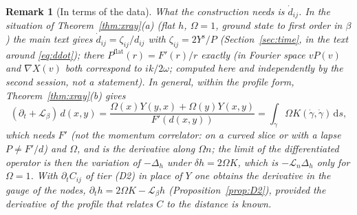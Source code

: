 \documentclass[11pt,a4paper]{article}
\theoremstyle{stmt}
\theoremstyle{defn}
\theoremstyle{rmk}
\newtheorem{remark}[theorem]{Remark}
\numberwithin{equation}{section}
\newcommand{\Lie}{\mathcal{L}}
\newcommand{\dd}{\mathrm{d}}
\begin{document}
{\begin{remark}[In terms of the data]
What the construction needs is $\dot d_{ij}$. In the situation of Theorem~\ref{thm:xray}(a) (flat $h$, $\Omega=1$, ground state to first order in $\beta$) the main text gives $\dot d_{ij}=\zeta_{ij}/d_{ij}$ with $\zeta_{ij}=2Y^{\mathrm s}/P$ (Section~\ref{sec:time}, in the text around \eqref{eq:ddot}); there $P^{\mathrm{flat}}(r)=F'(r)/r$ exactly (in Fourier space $vP(v)$ and $\nabla X(v)$ both correspond to $ik/2\omega$; computed here and independently by the second session, not a statement). In general, within the profile form, Theorem~\ref{thm:xray}(b) gives
\[
(\partial_t+\Lie_\beta)\,d(x,y)=\frac{\Omega(x)Y(y,x)+\Omega(y)Y(x,y)}{F'(d(x,y))}=\int_\gamma\Omega K(\dot\gamma,\dot\gamma)\,\dd s ,
\]
which needs $F'$ (not the momentum correlator: on a curved slice or with a lapse $P\ne F'/d$) and $\Omega$, and is the derivative along $\Omega n$; the limit of the differentiated operator is then the variation of $-\Delta_h$ under $\delta h=2\Omega K$, which is $-\Lie_n\Delta_h$ only for $\Omega=1$. With $\partial_tC_{ij}$ of tier \textup{(D2)} in place of $Y$ one obtains the derivative in the gauge of the nodes, $\partial_th=2\Omega K-\Lie_\beta h$ (Proposition~\ref{prop:D2}), provided the derivative of the profile that relates $C$ to the distance is known.
\end{remark}

}
\end{document}
